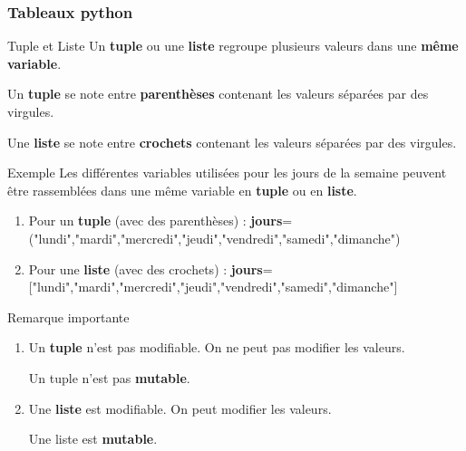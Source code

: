 \documentclass[9pt]{beamer}
\newcounter{num}
\begin{document}
\begin{frame}
\frametitle{Tableaux python}

\begin{block}{Tuple et Liste}
Un \textbf{tuple} ou une \textbf{liste} regroupe plusieurs valeurs dans une \textbf{même variable}.

Un \textbf{tuple} se note entre \textbf{parenthèses} contenant les valeurs séparées par des virgules.

Une \textbf{liste} se note entre \textbf{crochets} contenant les valeurs séparées par des virgules.

\end{block}

\begin{exampleblock}{Exemple}
Les différentes variables utilisées pour les jours de la semaine peuvent être rassemblées dans une même variable en \textbf{tuple} ou en \textbf{liste}.
\begin{enumerate}
\item Pour un \textbf{tuple} (avec des parenthèses) :
\textbf{jours}=("lundi","mardi","mercredi","jeudi","vendredi","samedi","dimanche")
\item Pour une \textbf{liste} (avec des crochets) :
\textbf{jours}=["lundi","mardi","mercredi","jeudi","vendredi","samedi","dimanche"]
\end{enumerate}
\end{exampleblock}


\begin{alertblock}{Remarque importante}
\begin{enumerate}
\item Un \textbf{tuple} n'est pas modifiable. On ne peut pas modifier les valeurs.

Un tuple n'est pas \textbf{mutable}.

\item Une \textbf{liste} est modifiable. On peut modifier les valeurs.

Une liste est \textbf{mutable}.
\end{enumerate}

\end{alertblock}

\end{frame}
\end{document}
